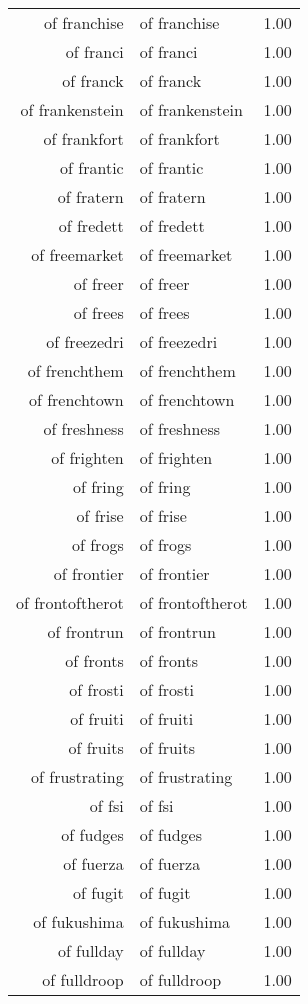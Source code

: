 \begin{table}[ht]
\begin{tabular}{rlr}
  of franchise & of franchise & 1.00 \\ 
  of franci & of franci & 1.00 \\ 
  of franck & of franck & 1.00 \\ 
  of frankenstein & of frankenstein & 1.00 \\ 
  of frankfort & of frankfort & 1.00 \\ 
  of frantic & of frantic & 1.00 \\ 
  of fratern & of fratern & 1.00 \\ 
  of fredett & of fredett & 1.00 \\ 
  of freemarket & of freemarket & 1.00 \\ 
  of freer & of freer & 1.00 \\ 
  of frees & of frees & 1.00 \\ 
  of freezedri & of freezedri & 1.00 \\ 
  of frenchthem & of frenchthem & 1.00 \\ 
  of frenchtown & of frenchtown & 1.00 \\ 
  of freshness & of freshness & 1.00 \\ 
  of frighten & of frighten & 1.00 \\ 
  of fring & of fring & 1.00 \\ 
  of frise & of frise & 1.00 \\ 
  of frogs & of frogs & 1.00 \\ 
  of frontier & of frontier & 1.00 \\ 
  of frontoftherot & of frontoftherot & 1.00 \\ 
  of frontrun & of frontrun & 1.00 \\ 
  of fronts & of fronts & 1.00 \\ 
  of frosti & of frosti & 1.00 \\ 
  of fruiti & of fruiti & 1.00 \\ 
  of fruits & of fruits & 1.00 \\ 
  of frustrating & of frustrating & 1.00 \\ 
  of fsi & of fsi & 1.00 \\ 
  of fudges & of fudges & 1.00 \\ 
  of fuerza & of fuerza & 1.00 \\ 
  of fugit & of fugit & 1.00 \\ 
  of fukushima & of fukushima & 1.00 \\ 
  of fullday & of fullday & 1.00 \\ 
  of fulldroop & of fulldroop & 1.00 \\ 

\end{tabular}
\end{table}

